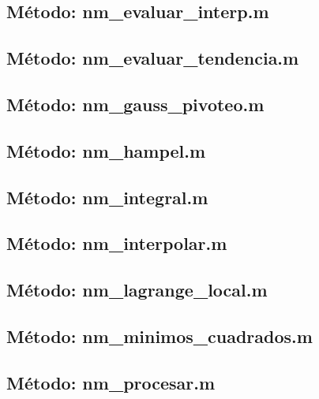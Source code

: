 \subsection*{Método: nm\_evaluar\_interp.m}


\subsection*{Método: nm\_evaluar\_tendencia.m}


\subsection*{Método: nm\_gauss\_pivoteo.m}


\subsection*{Método: nm\_hampel.m}


\subsection*{Método: nm\_integral.m}


\subsection*{Método: nm\_interpolar.m}


\subsection*{Método: nm\_lagrange\_local.m}


\subsection*{Método: nm\_minimos\_cuadrados.m}


\subsection*{Método: nm\_procesar.m}


